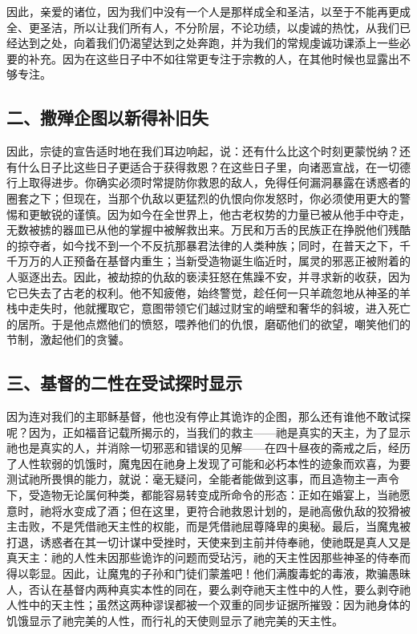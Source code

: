 因此，亲爱的诸位，因为我们中没有一个人是那样成全和圣洁，以至于不能再更成全、更圣洁，所以让我们所有人，不分阶层，不论功绩，以虔诚的热忱，从我们已经达到之处，向着我们仍渴望达到之处奔跑，并为我们的常规虔诚功课添上一些必要的补充。因为在这些日子中不如往常更专注于宗教的人，在其他时候也显露出不够专注。\par


\subsection{二、撒殚企图以新得补旧失}

因此，宗徒的宣告适时地在我们耳边响起，说：还有什么比这个时刻更蒙悦纳？还有什么日子比这些日子更适合于获得救恩？在这些日子里，向诸恶宣战，在一切德行上取得进步。你确实必须时常提防你救恩的敌人，免得任何漏洞暴露在诱惑者的圈套之下；但现在，当那个仇敌以更猛烈的仇恨向你发怒时，你必须使用更大的警惕和更敏锐的谨慎。因为如今在全世界上，他古老权势的力量已被从他手中夺走，无数被掳的器皿已从他的掌握中被解救出来。万民和万舌的民族正在挣脱他们残酷的掠夺者，如今找不到一个不反抗那暴君法律的人类种族；同时，在普天之下，千千万万的人正预备在基督内重生；当新受造物诞生临近时，属灵的邪恶正被附着的人驱逐出去。因此，被劫掠的仇敌的亵渎狂怒在焦躁不安，并寻求新的收获，因为它已失去了古老的权利。他不知疲倦，始终警觉，趁任何一只羊疏忽地从神圣的羊栈中走失时，他就攫取它，意图带领它们越过财宝的峭壁和奢华的斜坡，进入死亡的居所。于是他点燃他们的愤怒，喂养他们的仇恨，磨砺他们的欲望，嘲笑他们的节制，激起他们的贪饕。\par


\subsection{三、基督的二性在受试探时显示}

因为连对我们的主耶稣基督，他也没有停止其诡诈的企图，那么还有谁他不敢试探呢？因为，正如福音记载所揭示的，当我们的救主——祂是真实的天主，为了显示祂也是真实的人，并消除一切邪恶和错误的见解——在四十昼夜的斋戒之后，经历了人性软弱的饥饿时，魔鬼因在祂身上发现了可能和必朽本性的迹象而欢喜，为要测试祂所畏惧的能力，就说：毫无疑问，全能者能做到这事，而且造物主一声令下，受造物无论属何种类，都能容易转变成所命令的形态：正如在婚宴上，当祂愿意时，祂将水变成了酒；但在这里，更符合祂救恩计划的，是祂高傲仇敌的狡猾被主击败，不是凭借祂天主性的权能，而是凭借祂屈尊降卑的奥秘。最后，当魔鬼被打退，诱惑者在其一切计谋中受挫时，天使来到主前并侍奉祂，使祂既是真人又是真天主：祂的人性未因那些诡诈的问题而受玷污，祂的天主性因那些神圣的侍奉而得以彰显。因此，让魔鬼的子孙和门徒们蒙羞吧！他们满腹毒蛇的毒液，欺骗愚昧人，否认在基督内两种真实本性的同在，要么剥夺祂天主性中的人性，要么剥夺祂人性中的天主性；虽然这两种谬误都被一个双重的同步证据所摧毁：因为祂身体的饥饿显示了祂完美的人性，而行礼的天使则显示了祂完美的天主性。\par

